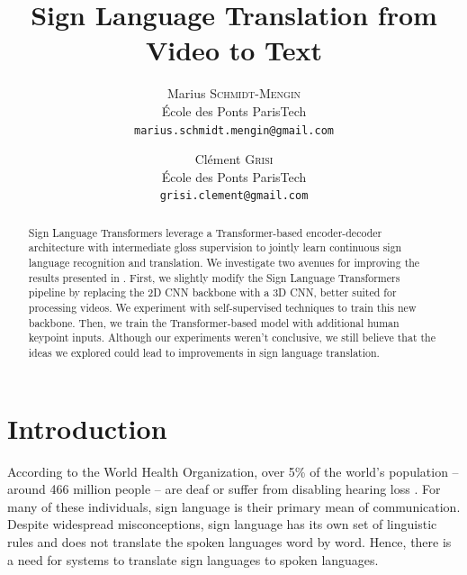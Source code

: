 \documentclass[final]{cvpr}
\begin{document}
\title{Sign Language Translation from Video to Text}

\author{Marius \textsc{Schmidt-Mengin}\\
	École des Ponts ParisTech\\
	{\tt\small marius.schmidt.mengin@gmail.com}
\and
Clément \textsc{Grisi}\\
École des Ponts ParisTech\\
{\tt\small grisi.clement@gmail.com}
}

\maketitle


\begin{abstract}
	Sign Language Transformers \cite{neccam} leverage a Transformer-based encoder-decoder architecture with intermediate gloss supervision to jointly learn continuous sign language recognition and translation. We investigate two avenues for improving the results presented in \cite{neccam}. First, we slightly modify the Sign Language Transformers pipeline by replacing the 2D CNN backbone with a 3D CNN, better suited for processing videos. We experiment with self-supervised techniques to train this new backbone. Then, we train the Transformer-based model with additional human keypoint inputs. Although our experiments weren't conclusive, we still believe that the ideas we explored could lead to improvements in sign language translation.
	
\end{abstract}

\section{Introduction}
According to the World Health Organization, over 5\% of the world’s population -- around 466 million people – are deaf or suffer from disabling hearing loss \cite{WHO}. For many of these individuals, sign language is their primary mean of communication. Despite widespread misconceptions, sign language has its own set of linguistic rules and does not translate the spoken languages word by word. Hence, there is a need for systems to translate sign languages to spoken languages.
\end{document}
